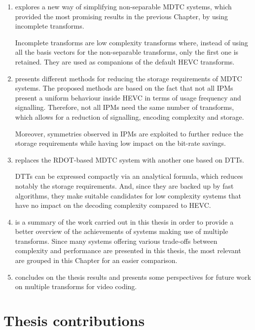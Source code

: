 \documentclass[11pt,a4paper,openright,twoside]{book}
\numberwithin{equation}{section} %
\numberwithin{figure}{section} %
\numberwithin{table}{section} %
\begin{document}
\begin{enumerate}
	\item explores a new way of simplifying non-separable \ac{MDTC} systems,
		which provided the most promising results in the previous Chapter, by
		using incomplete transforms.

		Incomplete transforms are low complexity transforms where, instead of
		using all the basis vectors for the non-separable transforms, only the
		first one is retained.
		They are used as companions of the default \acs{HEVC} transforms.

	\item presents different methods for reducing the storage requirements of
		\ac{MDTC} systems.
		The proposed methods are based on the fact that not all \aclp{IPM}
		present a uniform behaviour inside \ac{HEVC} in terms of usage
		frequency and signalling.
		Therefore, not all \aclp{IPM} need the same number of transforms,
		which allows for a reduction of signalling, encoding complexity and
		storage.

		Moreover, symmetries observed in \aclp{IPM} are exploited to further
		reduce the storage requirements while having low impact on the
		bit-rate savings.

	\item replaces the \ac{RDOT}-based \ac{MDTC} system with another one based
		on \acp{DTT}.

		\acp{DTT} can be expressed compactly via an analytical formula, which
		reduces notably the storage requirements.
		And, since they are backed up by fast algorithms, they make suitable
		candidates for low complexity systems that have no impact on the
		decoding complexity compared to \acs{HEVC}.

	\item is a summary of the work carried out in this thesis in order to
		provide a better overview of the achievements of systems making use of
		multiple transforms.
		Since many systems offering various trade-offs between complexity and
		performance are presented in this thesis, the most relevant are
		grouped in this Chapter for an easier comparison.

	\item concludes on the thesis results and presents some perspectives for
		future work on multiple transforms for video coding.
\end{enumerate}

\section*{Thesis contributions}
\label{sec:thesis_contributions}
\end{document}
